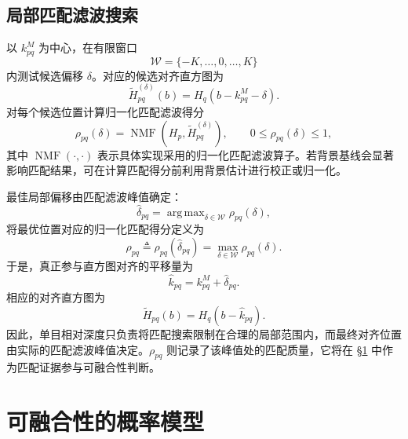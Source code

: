 \documentclass[11pt,a4paper]{ctexart}
\numberwithin{equation}{section}
\newcommand{\argmax}{\mathop{\mathrm{arg\,max}}}
\begin{document}
\subsection{局部匹配滤波搜索}

以 $k_{pq}^{M}$ 为中心，在有限窗口
\begin{equation}
    \mathcal W=\{-K,\ldots,0,\ldots,K\}
    \label{eq:search_window}
\end{equation}
内测试候选偏移 $\delta$。对应的候选对齐直方图为
\begin{equation}
    \widetilde H_{pq}^{(\delta)}(b)
    =
    H_q\!\left(b-k_{pq}^{M}-\delta\right).
    \label{eq:candidate_alignment}
\end{equation}
对每个候选位置计算归一化匹配滤波得分
\begin{equation}
    \rho_{pq}(\delta)
    =
    \operatorname{NMF}\!\left(
    H_p,
    \widetilde H_{pq}^{(\delta)}
    \right),
    \qquad
    0\leq\rho_{pq}(\delta)\leq1,
    \label{eq:normalized_match_score}
\end{equation}
其中 $\operatorname{NMF}(\cdot,\cdot)$ 表示具体实现采用的归一化匹配滤波算子。若背景基线会显著影响匹配结果，可在计算匹配得分前利用背景估计进行校正或归一化。

最佳局部偏移由匹配滤波峰值确定：
\begin{equation}
    \hat\delta_{pq}
    =
    \argmax_{\delta\in\mathcal W}
    \rho_{pq}(\delta),
    \label{eq:best_local_offset}
\end{equation}
将最优位置对应的归一化匹配得分定义为
\begin{equation}
    \rho_{pq}
    \triangleq
    \rho_{pq}(\hat\delta_{pq})
    =
    \max_{\delta\in\mathcal W}\rho_{pq}(\delta).
    \label{eq:best_match_score}
\end{equation}
于是，真正参与直方图对齐的平移量为
\begin{equation}
    \boxed{
    \hat k_{pq}
    =
    k_{pq}^{M}+\hat\delta_{pq}
    }.
    \label{eq:final_shift}
\end{equation}
相应的对齐直方图为
\begin{equation}
    \widetilde H_{pq}(b)
    =
    H_q(b-\hat k_{pq}).
    \label{eq:final_alignment}
\end{equation}
因此，单目相对深度只负责将匹配搜索限制在合理的局部范围内，而最终对齐位置由实际的匹配滤波峰值决定。$\rho_{pq}$ 则记录了该峰值处的匹配质量，它将在 \S\ref{sec:fusibility} 中作为匹配证据参与可融合性判断。

\section{可融合性的概率模型}
\label{sec:fusibility}
\end{document}
